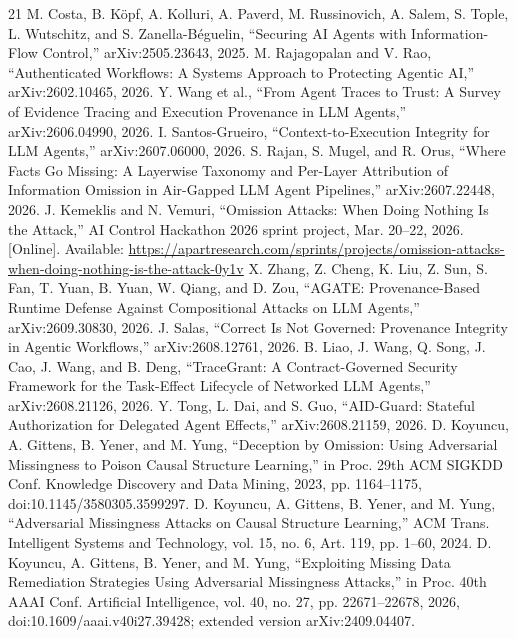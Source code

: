 \documentclass[journal,compsoc]{IEEEtran}
\begin{document}
\begin{thebibliography}{21}
 M. Costa, B. K{\"o}pf, A. Kolluri, A. Paverd, M. Russinovich, A. Salem, S. Tople, L. Wutschitz, and S. Zanella-B{\'e}guelin, ``Securing AI Agents with Information-Flow Control,'' arXiv:2505.23643, 2025.
 M. Rajagopalan and V. Rao, ``Authenticated Workflows: A Systems Approach to Protecting Agentic AI,'' arXiv:2602.10465, 2026.
 Y. Wang et al., ``From Agent Traces to Trust: A Survey of Evidence Tracing and Execution Provenance in LLM Agents,'' arXiv:2606.04990, 2026.
 I. Santos-Grueiro, ``Context-to-Execution Integrity for LLM Agents,'' arXiv:2607.06000, 2026.
 S. Rajan, S. Mugel, and R. Orus, ``Where Facts Go Missing: A Layerwise Taxonomy and Per-Layer Attribution of Information Omission in Air-Gapped LLM Agent Pipelines,'' arXiv:2607.22448, 2026.
 J. Kemeklis and N. Vemuri, ``Omission Attacks: When Doing Nothing Is the Attack,'' AI Control Hackathon 2026 sprint project, Mar. 20--22, 2026. [Online]. Available: \url{https://apartresearch.com/sprints/projects/omission-attacks-when-doing-nothing-is-the-attack-0y1v}
 X. Zhang, Z. Cheng, K. Liu, Z. Sun, S. Fan, T. Yuan, B. Yuan, W. Qiang, and D. Zou, ``AGATE: Provenance-Based Runtime Defense Against Compositional Attacks on LLM Agents,'' arXiv:2609.30830, 2026.
 J. Salas, ``Correct Is Not Governed: Provenance Integrity in Agentic Workflows,'' arXiv:2608.12761, 2026.
 B. Liao, J. Wang, Q. Song, J. Cao, J. Wang, and B. Deng, ``TraceGrant: A Contract-Governed Security Framework for the Task-Effect Lifecycle of Networked LLM Agents,'' arXiv:2608.21126, 2026.
 Y. Tong, L. Dai, and S. Guo, ``AID-Guard: Stateful Authorization for Delegated Agent Effects,'' arXiv:2608.21159, 2026.
 D. Koyuncu, A. Gittens, B. Yener, and M. Yung, ``Deception by Omission: Using Adversarial Missingness to Poison Causal Structure Learning,'' in Proc. 29th ACM SIGKDD Conf. Knowledge Discovery and Data Mining, 2023, pp. 1164--1175, doi:10.1145/3580305.3599297.
 D. Koyuncu, A. Gittens, B. Yener, and M. Yung, ``Adversarial Missingness Attacks on Causal Structure Learning,'' ACM Trans. Intelligent Systems and Technology, vol. 15, no. 6, Art. 119, pp. 1--60, 2024.
 D. Koyuncu, A. Gittens, B. Yener, and M. Yung, ``Exploiting Missing Data Remediation Strategies Using Adversarial Missingness Attacks,'' in Proc. 40th AAAI Conf. Artificial Intelligence, vol. 40, no. 27, pp. 22671--22678, 2026, doi:10.1609/aaai.v40i27.39428; extended version arXiv:2409.04407.

\end{thebibliography}
\end{document}

